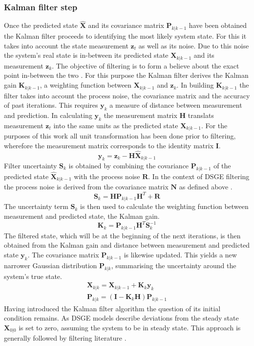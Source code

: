 \documentclass[12pt,a4paper,english]{article} %
\newcommand{\matr}[1]{\mathbf{#1}} %
\begin{document}
	\subsubsection{Kalman filter step}
	Once the predicted state $\matr{\hat{X}}$ and its covariance matrix $\matr{P}_{k| k-1}$ have been obtained the Kalman filter proceeds to identifying the most likely system state. For this it takes into account the state measurement $\matr{z}_t$ as well as its noise. Due to this noise the system's real state is in-between its predicted state $\matr{X}_{k| k-1}$ and its measurement $\matr{z}_k$. The objective of filtering is to form a believe about the exact point in-between the two \cite{andrews_kalman_2008}. For this purpose the Kalman filter derives the Kalman gain $\matr{K}_{k| k-1}$, a weighting function between $\matr{X}_{k| k-1}$ and $\matr{z}_k$. In building $\matr{K}_{k| k-1}$ the filter takes into account the process noise, the covariance matrix and the accuracy of past iterations.	
	This requires $\matr{y}_k$ a measure of distance between measurement and prediction. In calculating $\matr{y}_k$ the measurement matrix $\matr H$ translats measurement $\matr{z}_t$ into the same units as the predicted state $\matr{X}_{k| k-1}$. For the purposes of this work all unit transformation has been done prior to filtering, wherefore the measurement matrix corresponds to the identity matrix $\matr{I}$.
	\[
		\matr{y}_{k} = \matr{z}_k - \matr H \hat{\matr{X}}_{k| k-1}
	\]
	Filter uncertainty $\matr{S}_k$ is obtained by combining the covariance $\matr{P}_{k| k-1}$ of the predicted state $\matr{\hat{X}}_{k| k-1}$ with the process noise $\matr{R}$. In the context of DSGE filtering the process noise is derived from the covariance matrix $\matr{N}$ as defined above \cite{guerron-quintana_bayesian_2013}.
	\[
		\matr{S}_k = \matr H \matr{P}_{k| k-1} \matr{H}^T + \matr{R}
	\]
	The uncertainty term $\matr{S}_{k}$ is then used to calculate the weighting function between measurement and predicted state, the Kalman gain. 
	\[
		\matr{K}_k = \matr{P}_{k| k-1} \matr{H}^T \matr{S}_{k}^{-1}
	\]
	The filtered state, which will be at the beginning of the next iterations, is then obtained from the Kalman gain and distance between measurement and predicted state $\matr{y}_k$. The covariance matrix $\matr{P}_{k|k-1}$ is likewise updated. This yields a new narrower Gaussian distribution $\matr{P}_{k|k}$, summarising the uncertainty around the system's true state.
	\begin{equation}
		\begin{aligned}
			\matr{X}_{k|k} = \matr{X}_{k| k-1} + \matr{K}_k \matr{y}_k \\
			\matr{P}_{k|k} = (\matr I - \matr{K}_k \matr{H}) \matr{P}_{k|k-1}		
		\end{aligned}
	\end{equation}
	Having introduced the Kalman filter algorithm the question of its initial condition remains. As DSGE models describe deviations from the steady state $\matr{X}_{0|0}$ is set to zero, assuming the system to be in steady state. This approach is generally followed by filtering literature \cite{schorfheide_loss_2000}. 
	
\end{document}
